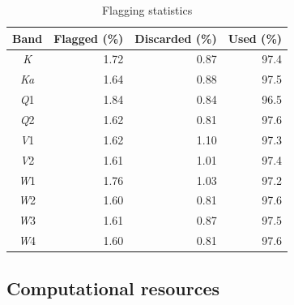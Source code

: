 \documentclass[twocolumn]{../../common/aa}
\newcommand{\K}[0]{\textit K}
\newcommand{\Ka}[0]{\textit{Ka}}
\newcommand{\Q}[0]{\textit Q}
\newcommand{\V}[0]{\textit V}
\newcommand{\W}[0]{\textit W}
\begin{document}
\begin{table}
\caption{Flagging statistics}              %
\label{table:flagged_data}      %
\centering                                      %
\begin{tabular}{c r r r}          %
\hline\hline                        %
	Band & Flagged (\%) & Discarded (\%) & Used (\%) \\    %
\hline                                   %
	\K  &  1.72 & 0.87 & 97.4\\
	\Ka &  1.64 & 0.88 & 97.5\\      %
	\Q1 &  1.84 & 0.84 & 96.5\\
	\Q2 &  1.62 & 0.81 & 97.6\\
	\V1 &  1.62 & 1.10 & 97.3\\
	\V2 &  1.61 & 1.01 & 97.4\\
	\W1 &  1.76 & 1.03 & 97.2\\
	\W2 &  1.60 & 0.81 & 97.6\\
	\W3 &  1.61 & 0.87 & 97.5\\
	\W4 &  1.60 & 0.81 & 97.6\\
\hline                                             %
\end{tabular}
\end{table}




\subsection{Computational resources}
\label{sec:resources}
\end{document}
